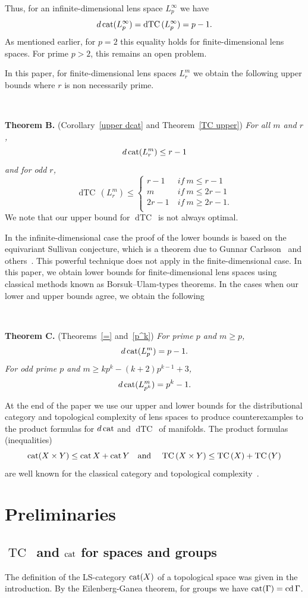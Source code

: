 \documentclass{amsart}
\numberwithin{equation}{section}
\theoremstyle{plain}
\theoremstyle{definition}
\def\TC{{\mathop\mathrm{TC}\,}}
\def\dTC{{\mathop\mathrm{dTC}\,}}
\def\cat{\protect\operatorname{cat}}
\def\cd{\protect\operatorname{cd}}
\begin{document}
Thus, for an infinite-dimensional lens space $L^\infty_p$ we have $$d\cat(L^\infty_p)=\dTC(L^\infty_p)=p-1.$$
As mentioned earlier, for $p=2$ this equality holds for finite-dimensional lens spaces. For prime $p>2$, this remains an open problem. 

In this paper, for finite-dimensional lens spaces $L^m_r$ we obtain the following upper bounds where $r$ is non necessarily prime.

\

{\bf Theorem B.} (Corollary~\ref{upper dcat} and Theorem~\ref{TC upper}) {\em For all $m$ and  $r$, $$d\cat(L^m_r)\le r-1$$ 
and for odd $r$,}
 $$
\dTC(L^m_r)\le\begin{cases}r-1\ & if\ m\le r-1\\ 
m\ & if\ m\le 2r-1\\
2r-1\ & if\ m\ge 2r-1.\\
\end{cases}
$$
We note that our upper bound for $\dTC$ is not always optimal.

In the infinite-dimensional case the proof of the lower bounds is based on the equivariant Sullivan conjecture, which is a theorem due to Gunnar Carlsson~\cite{C} and others~\cite{DMN,La}. This powerful technique does not apply in the finite-dimensional case. In this paper, we obtain lower bounds for finite-dimensional lens spaces using classical methods known as Borsuk--Ulam-types theorems. In the cases when our lower and upper bounds agree, we obtain the following 

\

{\bf Theorem C.} (Theorems~\ref{=} and~\ref{p^k}) {\em For prime $p$ and  $m\ge p$,
 $$d\cat(L^m_p)=p-1.$$ 
For odd prime $p$ and $m\ge kp^k-(k+2)p^{k-1}+3$,
$$d\cat(L^m_{p^k})= p^k-1.$$ }

At the end of the paper we use our upper and lower bounds  for  the distributional category and topological complexity of lens spaces to produce counterexamples to the product formulas for $d\cat$ and $\dTC$ of manifolds.
The product formulas (inequalities)
$$\cat(X\times Y)\le\cat X+\cat Y\ \ \ \text{and}\ \ \ \ \TC(X\times Y)\le\TC(X)+\TC(Y)$$ are well known for the classical category and  topological complexity~\cite{CLOT,F2}.


\section{Preliminaries}
\subsection{$\TC$  and $\cat$ for spaces and groups} The definition of the LS-category $\cat(X)$ of a topological space was given in the introduction.
By the Eilenberg-Ganea theorem, for groups we have $\cat(\Gamma)=\cd{\Gamma}$.
\end{document}
